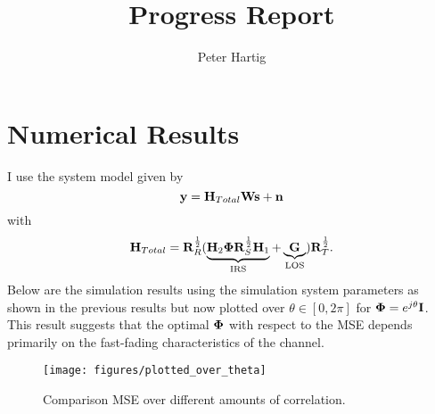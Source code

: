 \documentclass[12pt,a4paper]{report}
\title{Progress Report}
\author{Peter Hartig}
\begin{document}
\maketitle
\tableofcontents

\section{Numerical Results}
I use the system model given by 
\begin{equation}
\mathbf{y} = \mathbf{H}_{Total} \mathbf{W} \mathbf{s}  + \mathbf{n}
\end{equation}
with 
	\begin{equation}
	\mathbf{H}_{Total} = \mathbf{R}_{R}^{\frac{1}{2}}(\underbrace{\mathbf{H}_{2}\boldsymbol{\Phi}\mathbf{R}_{S}^{\frac{1}{2}}\mathbf{H}_{1}}_{\text{IRS}} + \underbrace{\mathbf{G}}_{\text{LOS}})\mathbf{R}_{T}^{\frac{1}{2}}.
	\end{equation}
Below are the simulation results using the simulation system parameters as shown in the previous results but now plotted over $\theta \in [0, 2\pi]$ for $\boldsymbol{\Phi} = e^{j\theta}\mathbf{I}$. This result suggests that the optimal $\boldsymbol{\Phi}$ with respect to the MSE depends  primarily on the fast-fading characteristics of the channel.
		\begin{figure}[H]
	\texttt{[image: figures/plotted\_over\_theta]}
	  \caption{Comparison MSE over different amounts of correlation.}
	  	  \label{MSE_correlation}
	\end{figure} 
\end{document}

